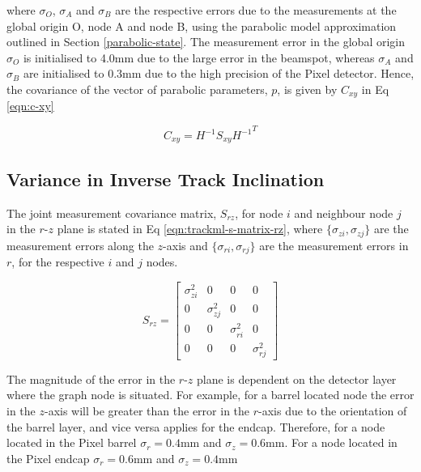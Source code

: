 where $\sigma_O$, $\sigma_A$ and $\sigma_B$ are the respective errors due to the measurements at the global origin O, node A and node B, using the parabolic model approximation outlined in Section \ref{parabolic-state}. The measurement error in the global origin $\sigma_O$ is initialised to 4.0mm due to the large error in the beamspot, whereas $\sigma_A$ and $\sigma_B$ are initialised to 0.3mm due to the high precision of the Pixel detector. Hence, the covariance of the vector of parabolic parameters, $p$, is given by $C_{xy}$ in Eq \eqref{eqn:c-xy}

\begin{equation}
    C_{xy} = H^{-1}S_{xy}{H^{-1}}^{T}
    \label{eqn:c-xy}
\end{equation}






\subsection{Variance in Inverse Track Inclination}

The joint measurement covariance matrix, $S_{rz}$, for node $i$ and neighbour node $j$ in the $r$-$z$ plane is stated in Eq \eqref{eqn:trackml-s-matrix-rz}, where $\{ \sigma_{zi}, \sigma_{zj} \}$ are the measurement errors along the $z$-axis and $\{ \sigma_{ri}, \sigma_{rj} \}$ are the measurement errors in $r$, for the respective $i$ and $j$ nodes. 

\begin{equation}
    S_{rz} = \begin{bmatrix} \sigma_{zi}^{2} & 0 & 0 & 0 \\ 
                             0 & \sigma_{zj}^{2} & 0 & 0 \\ 
                             0 & 0 & \sigma_{ri}^{2} & 0 \\
                             0 & 0 & 0 & \sigma_{rj}^{2}
                            \end{bmatrix} 
    \label{eqn:trackml-s-matrix-rz}
\end{equation}


The magnitude of the error in the $r$-$z$ plane is dependent on the detector layer where the graph node is situated. For example, for a barrel located node the error in the $z$-axis will be greater than the error in the $r$-axis due to the orientation of the barrel layer, and vice versa applies for the endcap. Therefore, for a node located in the Pixel barrel $\sigma_r = 0.4$mm and $\sigma_z = 0.6$mm. For a node located in the Pixel endcap $\sigma_r = 0.6$mm and $\sigma_z = 0.4$mm


